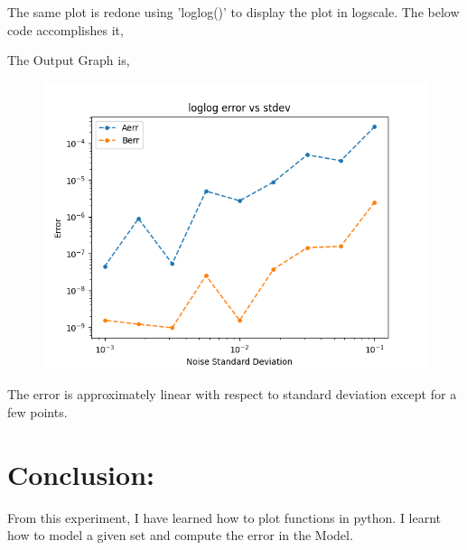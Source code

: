 \documentclass[12pt, a4paper]{report}
\begin{document}
\vspace{2mm}
\noindent
The same plot is redone using {\selectfont
'loglog()'
} to display the plot in logscale. The below code accomplishes it,
\vspace{2mm}

The Output Graph is,
\begin{figure}[h!]
    \centering
    \includegraphics[scale=0.8]{loglog.png} 
    \caption{}
    \label{fig:my_label}
\end{figure}
\vspace{1mm}

\noindent
The error is approximately linear with respect to standard deviation except for a few points.\\
\section{Conclusion:}
From this experiment, I have learned how to plot functions in python. I learnt how to model a given set and compute the error in the Model.
\end{document}
